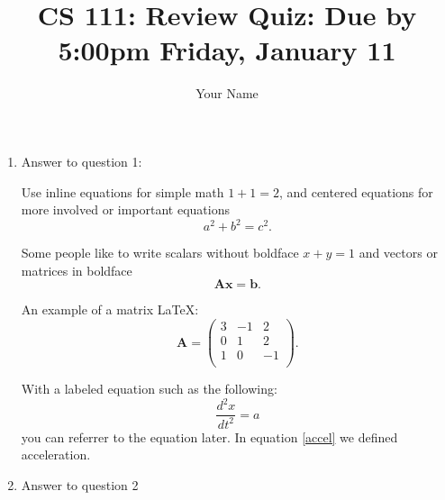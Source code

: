 \documentclass[11pt]{article}
\begin{document}
\author{Your Name}
\title{CS 111: Review Quiz: Due by 5:00pm Friday, January 11}
\maketitle

\medskip

\begin{enumerate}

	\item
	      Answer to question 1:

	      Use inline equations for simple math $1+1=2$, and centered equations for more involved or important equations
	      \begin{equation}
		      a^2 + b^2 = c^2.
	      \end{equation}

	      Some people like to write scalars without boldface $x+y=1$ and vectors or matrices in boldface
	      \begin{equation}
		      \mathbf{A} \mathbf{x} = \mathbf{b}.
	      \end{equation}

	      An example of a matrix \LaTeX:
	      \begin{equation}
		      \mathbf{A} = \left(
		      \begin{array}{ccc}
				      3 & -1 & 2  \\
				      0 & 1  & 2  \\
				      1 & 0  & -1 \\
			      \end{array}
		      \right).
	      \end{equation}

	      With a labeled equation such as the following:
	      \begin{equation}
		      \label{accel}
		      \frac{d^2 x}{d t^2} = a
	      \end{equation}
	      you can referrer to the equation later. In equation \ref{accel} we defined acceleration.


	\item
	      Answer to question 2


\end{enumerate}
\end{document}
